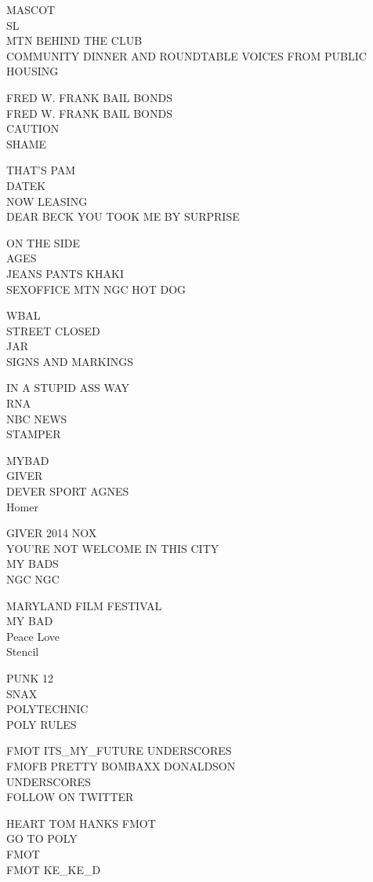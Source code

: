 \documentclass[10pt,letterpaper]{article}
\begin{document}
MASCOT\\
SL\\
MTN BEHIND THE CLUB\\
COMMUNITY DINNER AND ROUNDTABLE VOICES FROM PUBLIC HOUSING

FRED W. FRANK BAIL BONDS\\
FRED W. FRANK BAIL BONDS\\
CAUTION\\
SHAME

THAT'S PAM\\
DATEK\\
NOW LEASING\\
DEAR BECK YOU TOOK ME BY SURPRISE

ON THE SIDE\\
AGES\\
JEANS PANTS KHAKI\\
SEXOFFICE MTN NGC HOT DOG

WBAL\\
STREET CLOSED\\
JAR\\
SIGNS AND MARKINGS

IN A STUPID ASS WAY\\
RNA\\
NBC NEWS\\
STAMPER

MYBAD\\
GIVER\\
DEVER SPORT AGNES\\
Homer

GIVER 2014 NOX\\
YOU'RE NOT WELCOME IN THIS CITY\\
MY BADS\\
NGC NGC

MARYLAND FILM FESTIVAL\\
MY BAD\\
Peace Love\\
Stencil

PUNK 12\\
SNAX\\
POLYTECHNIC\\
POLY RULES

FMOT ITS\_MY\_FUTURE UNDERSCORES\\
FMOFB PRETTY BOMBAXX DONALDSON\\
UNDERSCORES\\
FOLLOW ON TWITTER

HEART TOM HANKS FMOT\\
GO TO POLY\\
FMOT\\
FMOT KE\_KE\_D
\end{document}
